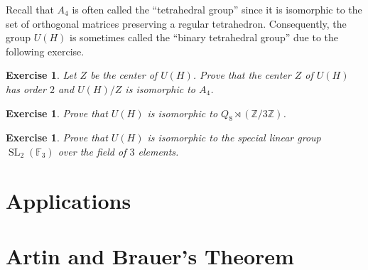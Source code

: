 \documentclass[12pt]{article}
\theoremstyle{plain}
\newtheorem{exercise}[theorem]{Exercise}
\theoremstyle{definition}
\theoremstyle{remark}
\numberwithin{equation}{section}
\begin{document}
Recall that $A_4$ is often called the ``tetrahedral group''
since it is isomorphic to the set of orthogonal matrices preserving a
regular tetrahedron.
Consequently, the group $U(H)$ is sometimes called the ``binary tetrahedral group''
due to the following exercise.

\begin{exercise}
Let $Z$ be the center of $U(H)$.
Prove that the center $Z$ of $U(H)$ has order $2$ and
$U(H)/Z $ is isomorphic to $A_4$.
\end{exercise}


\begin{exercise}
Prove that $U(H)$ is isomorphic to $Q_8 \rtimes (\mathbb{Z}/3\mathbb{Z})$.
\end{exercise}

\begin{exercise}
Prove that $U(H)$ is isomorphic to the special linear group
$\operatorname{SL}_2(\mathbb{F}_3)$ over the field of $3$ elements.
\end{exercise}

\section{Applications}

\section{Artin and Brauer's Theorem}





\end{document}
